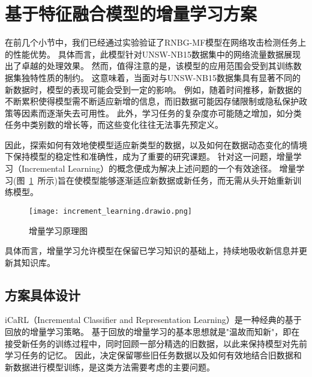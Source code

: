 \section{基于特征融合模型的增量学习方案}
在前几个小节中，我们已经通过实验验证了RNBG-MF模型在网络攻击检测任务上的性能优势。
具体而言，此模型针对UNSW-NB15数据集中的网络流量数据展现出了卓越的处理效果。
然而，值得注意的是，该模型的应用范围会受到其训练数据集独特性质的制约。
这意味着，当面对与UNSW-NB15数据集具有显著不同的新数据时，模型的表现可能会受到一定的影响。
例如，随着时间推移，新数据的不断累积使得模型需不断适应新增的信息，而旧数据可能因存储限制或隐私保护政策等因素而逐渐失去可用性。
此外，学习任务的复杂度亦可能随之增加，如分类任务中类别数的增长等，而这些变化往往无法事先预定义。\par

因此，探索如何有效地使模型适应新类型的数据，以及如何在数据动态变化的情境下保持模型的稳定性和准确性，成为了重要的研究课题。
针对这一问题，增量学习（Incremental Learning）的概念便成为解决上述问题的一个有效途径。
增量学习(图~\ref{fig:incremental_learning}~所示)旨在使模型能够逐渐适应新数据或新任务，而无需从头开始重新训练模型。
\begin{figure}[htbp]
	\centering
	\texttt{[image: increment\_learning.drawio.png]}
	\caption{增量学习原理图}
	\label{fig:incremental_learning}
\end{figure}
具体而言，增量学习允许模型在保留已学习知识的基础上，持续地吸收新信息并更新其知识库。

\subsection{方案具体设计}
iCaRL（Incremental Classifier and Representation Learning）\cite{rebuffi2017icarl}是一种经典的基于回放的增量学习策略。
基于回放的增量学习的基本思想就是"温故而知新"，即在接受新任务的训练过程中，同时回顾一部分精选的旧数据，以此来保持模型对先前学习任务的记忆。
因此，决定保留哪些旧任务数据以及如何有效地结合旧数据和新数据进行模型训练，是这类方法需要考虑的主要问题。\par


